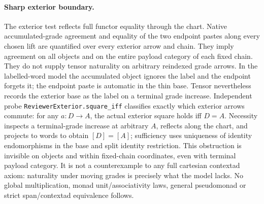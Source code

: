 \documentclass{article}
\begin{document}
\paragraph{Sharp exterior boundary.} The exterior test reflects full
functor equality through the chart. Native accumulated-grade agreement
and equality of the two endpoint pastes along every chosen lift are
quantified over every exterior arrow and chain. They imply agreement on
all objects and on the entire payload category of each fixed chain.
They do not supply tensor naturality on arbitrary reindexed grade
arrows. In the labelled-word model the accumulated object ignores the
label and the endpoint forgets it; the endpoint paste is automatic in
the thin base. Tensor nevertheless records the exterior base as the label
on a terminal grade increase. Independent probe
\texttt{ReviewerExterior.square\_iff} classifies exactly which exterior
arrows commute: for any $a:D\to A$, the actual exterior square holds
iff $D=A$. Necessity inspects a terminal-grade increase at arbitrary $A$,
reflects along the chart, and projects to words to obtain $[D]=[A]$;
sufficiency uses uniqueness of identity endomorphisms in the base
and split identity restriction. This obstruction is invisible on objects
and within fixed-chain coordinates, even with terminal payload category.
It is not a counterexample to any full cartesian contextad axiom:
naturality under moving grades is precisely what the model lacks.
No global multiplication, monad unit/associativity laws, general
pseudomonad or strict span/contextad equivalence follows.
\end{document}
